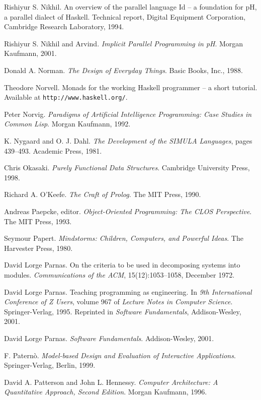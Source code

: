 \begin{thebibliography}{213}
Rishiyur S. Nikhil. An overview of the parallel language Id – a foundation for pH, a parallel dialect of Haskell. Technical report, Digital Equipment Corporation, Cambridge Research Laboratory, 1994.

Rishiyur S. Nikhil and Arvind. \emph{Implicit Parallel Programming in pH}. Morgan Kaufmann, 2001.

Donald A. Norman. \emph{The Design of Everyday Things}. Basic Books, Inc., 1988.

Theodore Norvell. Monads for the working Haskell programmer – a short tutorial. Available at \verb"http://www.haskell.org/".

Peter Norvig. \emph{Paradigms of Artificial Intelligence Programming: Case Studies in Common Lisp}. Morgan Kaufmann, 1992.

K. Nygaard and O. J. Dahl. \emph{The Development of the SIMULA Languages}, pages 439–493. Academic Press, 1981.

Chris Okasaki. \emph{Purely Functional Data Structures}. Cambridge University Press, 1998.

Richard A. O’Keefe. \emph{The Craft of Prolog}. The MIT Press, 1990.

Andreas Paepcke, editor. \emph{Object-Oriented Programming: The CLOS Perspective}. The MIT Press, 1993.

Seymour Papert. \emph{Mindstorms: Children, Computers, and Powerful Ideas}. The Harvester Press, 1980.

David Lorge Parnas. On the criteria to be used in decomposing systems into modules. \emph{Communications of the ACM}, 15(12):1053–1058, December 1972.

David Lorge Parnas. Teaching programming as engineering. In \emph{9th International Conference of Z Users}, volume 967 of \emph{Lecture Notes in Computer Science}. Springer-Verlag, 1995. Reprinted in \emph{Software Fundamentals}, Addison-Wesley, 2001.

David Lorge Parnas. \emph{Software Fundamentals}. Addison-Wesley, 2001.

F. Patern\`o. \emph{Model-based Design and Evaluation of Interactive Applications}. Springer-Verlag, Berlin, 1999.

David A. Patterson and John L. Hennessy. \emph{Computer Architecture: A Quantitative Approach, Second Edition}. Morgan Kaufmann, 1996.


\end{thebibliography}

